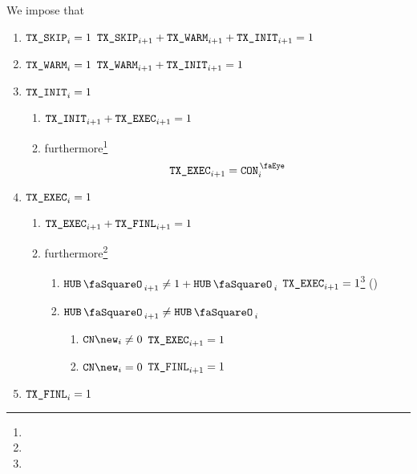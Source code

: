 We impose that
\begin{enumerate}
        \item \If $\texttt{TX}\texttt{\_SKIP} _{i} = 1$ \Then $\texttt{TX}\texttt{\_SKIP} _{i + 1} + \texttt{TX}\texttt{\_WARM} _{i + 1} + \texttt{TX}\texttt{\_INIT} _{i + 1} = 1$
        \item \If $\texttt{TX}\texttt{\_WARM} _{i} = 1$ \Then $                   \texttt{TX}\texttt{\_WARM} _{i + 1} + \texttt{TX}\texttt{\_INIT} _{i + 1} = 1$
        \item \If $\texttt{TX}\texttt{\_INIT} _{i} = 1$ \Then
                \begin{enumerate}
                        \item $\texttt{TX}\texttt{\_INIT} _{i + 1} + \texttt{TX}\texttt{\_EXEC} _{i + 1} = 1$
                        \item furthermore\footnote{}
                                \[
                                        \txExec _{i + 1} = \peekContext _{i}
                                \]
                \end{enumerate}
        \item \If $\texttt{TX}\texttt{\_EXEC} _{i} = 1$ \Then
                \begin{enumerate}
                        \item $\texttt{TX}\texttt{\_EXEC} _{i + 1} + \texttt{TX}\texttt{\_FINL} _{i + 1} = 1$
                        \item furthermore\footnote{}
                                \begin{enumerate}
                                        \item \If $\hubStamp _{i + 1} \neq 1 + \hubStamp _{i}$ \Then $\texttt{TX}\texttt{\_EXEC} _{i + 1} = 1$\footnote{} \quad (\sanityCheck)
                                        \item \If $\hubStamp _{i + 1} \neq     \hubStamp _{i}$ \Then
                                                \begin{enumerate}
                                                        \item \If $\cn\new _{i} \neq 0$ \Then $\texttt{TX}\texttt{\_EXEC} _{i + 1} = 1$
                                                        \item \If $\cn\new _{i} =    0$ \Then $\texttt{TX}\texttt{\_FINL} _{i + 1} = 1$
                                                \end{enumerate}
                                \end{enumerate}
                \end{enumerate}
        \item \If $\texttt{TX}\texttt{\_FINL} _{i} = 1$ \Then

\end{enumerate}
